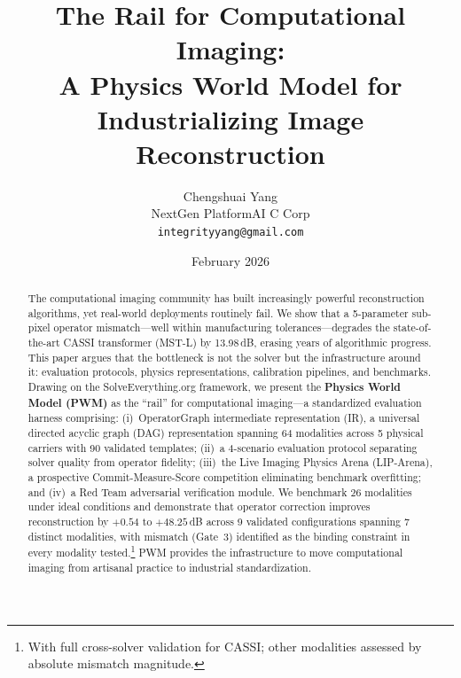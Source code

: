 

\title{The Rail for Computational Imaging:\\
A Physics World Model for Industrializing Image Reconstruction}

\author{Chengshuai Yang\\
NextGen PlatformAI C Corp\\
\texttt{integrityyang@gmail.com}}

\date{February 2026}


\maketitle

\begin{abstract}
The computational imaging community has built increasingly powerful
reconstruction algorithms, yet real-world deployments routinely fail.
We show that a 5-parameter sub-pixel operator mismatch---well within
manufacturing tolerances---degrades the state-of-the-art CASSI
transformer (MST-L) by 13.98\,dB, erasing years of
algorithmic progress.
This paper argues that the bottleneck is not the solver but the
infrastructure around it: evaluation protocols, physics representations,
calibration pipelines, and benchmarks.
Drawing on the SolveEverything.org framework, we present the
\textbf{Physics World Model (PWM)} as the ``rail'' for computational
imaging---a standardized evaluation harness comprising:
(i)~OperatorGraph intermediate representation (IR), a universal directed acyclic graph (DAG) representation spanning 64
modalities across 5 physical carriers with 90 validated templates;
(ii)~a 4-scenario evaluation protocol separating solver quality from
operator fidelity;
(iii)~the Live Imaging Physics Arena (LIP-Arena), a prospective Commit-Measure-Score competition
eliminating benchmark overfitting; and
(iv)~a Red Team adversarial verification module.
We benchmark 26 modalities under ideal conditions and demonstrate that operator correction
improves reconstruction by $+0.54$ to $+48.25$\,dB across 9 validated configurations spanning 7 distinct modalities, with mismatch (Gate~3) identified as the binding constraint
in every modality tested.\footnote{With full cross-solver validation for CASSI; other modalities assessed by absolute mismatch magnitude.}
PWM provides the infrastructure to move computational imaging from
artisanal practice to industrial standardization.
\end{abstract}

